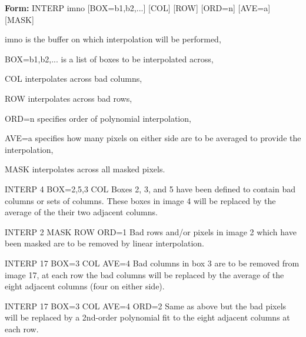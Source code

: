 {\newpage\clearpage
{}%
\begin{command}
  \item[\textbf{Form: }INTERP imno {[BOX=b1,b2,...]} {[COL]} {[ROW]} {[ORD=n]} {[AVE=a]} {[MASK]}\hfill]{}
  \item[imno]{is the buffer on which interpolation will be performed,}
  \item[BOX=b1,b2,...]{is a list of boxes to be interpolated across,}
  \item[COL]{interpolates across bad columns,}
  \item[ROW]{interpolates across bad rows,}
  \item[ORD=n]{specifies order of polynomial interpolation,}
  \item[AVE=a]{specifies how many pixels on either side are to be averaged 
       to provide the interpolation,}
  \item[MASK]{interpolates across all masked pixels.}
\end{command}%
\lthtmlfigureZ
\lthtmlcheckvsize\clearpage}

{\newpage\clearpage
{}%
\begin{example}
  \item[INTERP 4 BOX=2,5,3 COL\hfill]{Boxes 2, 3, and 5 have been defined
       to contain bad columns or sets of columns.  These boxes in image 4
       will be replaced by the average of the their two adjacent columns.}
\par
\item[INTERP 2 MASK ROW ORD=1\hfill]{Bad rows and/or pixels in image 2
       which have been masked are to be removed by linear interpolation.}
\par
\item[INTERP 17 BOX=3 COL AVE=4\hfill]{Bad columns in box 3 are to be
       removed from image 17, at each row the bad columns will be replaced
       by the average of the eight adjacent columns (four on either side).}
\par
\item[INTERP 17 BOX=3 COL AVE=4 ORD=2\hfill]{Same as above but the bad
       pixels will be replaced by a 2nd-order polynomial fit to the eight
       adjacent columns at each row.}
\end{example}%
\lthtmlfigureZ
\lthtmlcheckvsize\clearpage}

